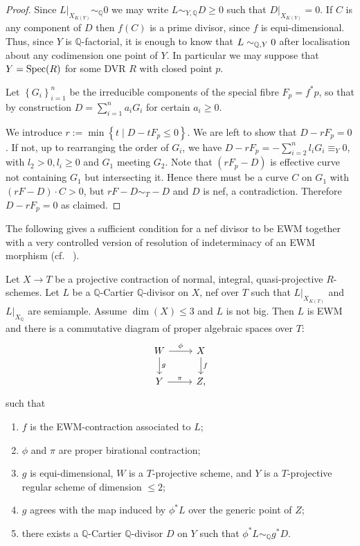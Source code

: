 \begin{proof}
	Since $L|_{X_{K(Y)}} \sim_{\mathbb{Q}} 0$ we may write $L\sim_{Y, \mathbb{Q}} D\geq 0$ such that $D|_{X_{K(Y)}}=0$. If $C$ is any component of $D$ then $f(C)$ is a prime divisor, since $f$ is equi-dimensional. Thus, since $Y$ is $\mathbb{Q}$-factorial, it is enough to know that $L \sim_{\mathbb{Q},Y} 0$ after localisation about any codimension one point of $Y$. In particular we may suppose that $Y= \operatorname{Spec} (R)$ for some DVR $R$ with closed point $p$.
	
	Let $\left\{G_i \right\}_{i=1}^n$ be the irreducible components of the special fibre $F_p=f^*p$, so that by construction $D = \sum_{i=1}^n a_i G_i$ for certain $a_i \geq 0$.	
	
	We introduce $r:= \min \left\{ t \mid D -tF_p \leq 0 \right\}$. We are left to show that $D-rF_p=0$. 
	If not, up to rearranging the order of $G_i$, we have $D-rF_p=-\sum_{i=2}^n l_i G_i \equiv_Y 0$, with $l_2 >0, l_i \geq 0$ and $G_{1}$ meeting $G_{2}$. Note that $(rF_p-D)$ is effective curve not containing $G_{1}$ but intersecting it. Hence there must be a curve $C$ on $G_{1}$ with $(rF-D) \cdot C >0$, but $rF-D \sim_{T} -D$ and $D$ is nef, a contradiction. Therefore $D-rF_p=0$ as claimed.
\end{proof}


The following gives a sufficient condition for a nef divisor to be EWM together with a very controlled version of resolution of indeterminacy of an EWM morphism (cf.~ \cite[Lemma 9.25]{bhatt2020}).

\begin{lemma}\label{two}
	Let $X \to T$ be a projective contraction of normal, integral, quasi-projective $R$-schemes.
	Let $L$ be a $\mathbb{Q}$-Cartier $\mathbb{Q}$-divisor on $X$, nef over $T$ such that $L|_{X_{K(T)}}$ and $L|_{X_{\mathbb{Q}}}$ are semiample.
	Assume $\dim (X) \leq 3$ and $L$ is not big. 
	Then $L$ is EWM and there is a commutative diagram of proper algebraic spaces over $T$:
	\[
	\begin{tikzcd}
	W \arrow[d, "g"] \arrow[r, "\phi"] & X \arrow[d, "f"] \\
	Y \arrow[r, "\pi"]                 & Z      ,        
	\end{tikzcd}
	\]
	such that 
	\begin{enumerate}
		\item $f$ is the EWM-contraction associated to $L$;
		\item $\phi$ and $\pi$ are proper birational contraction;
		\item  $g$ is equi-dimensional, $W$ is a $T$-projective scheme, and $Y$ is a $T$-projective regular scheme of dimension $\leq 2$;
		\item $g$ agrees with the map induced by $\phi^*L$ over the generic point of $Z$;
		\item  there exists a $\mathbb{Q}$-Cartier $\mathbb{Q}$-divisor $D$ on $Y$ such that $\phi^{*}L \sim_{\mathbb{Q}} g^{*}D$.
	\end{enumerate}  
\end{lemma}

